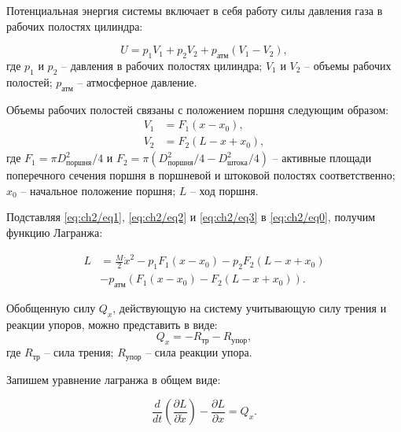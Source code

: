 Потенциальная энергия системы включает в себя работу силы давления газа в рабочих полостях цилиндра:

\begin{equation}
\label{eq:ch2/eq2}
    U = p_1 V_1 + p_2 V_2 + p_\text{атм} (V_1 - V_2),
\end{equation}
где $p_1$ и $p_2$ -- давления в рабочих полостях цилиндра;
$V_1$ и $V_2$ -- объемы рабочих полостей;
$p_\text{атм}$ -- атмосферное давление.

Объемы рабочих полостей связаны с положением поршня следующим образом:
\begin{equation}
\label{eq:ch2/eq3}
    \begin{aligned}
        V_1 & = F_1 (x - x_0),     \\
        V_2 & = F_2 (L - x + x_0),
    \end{aligned}
\end{equation}
где $F_1=\pi D_{поршня}^2/4 $ и $F_2 = \pi (D_{поршня}^2/4 - D_{штока}^2/4)$ -- активные площади поперечного сечения поршня в поршневой и штоковой полостях соответственно;
$x_0$ -- начальное положение поршня;
$L$ -- ход поршня.

Подставляя \eqref{eq:ch2/eq1}, \eqref{eq:ch2/eq2} и \eqref{eq:ch2/eq3} в \eqref{eq:ch2/eq0}, получим функцию Лагранжа:

\begin{equation}
\label{eq:ch2/eq4}
    \begin{aligned}
        L & = \frac{M}{2} \dot{x}^2 - p_1 F_1 (x - x_0) - p_2 F_2 (L - x + x_0) \\
          & - p_\text{атм} (F_1 (x - x_0) - F_2 (L - x + x_0)).
    \end{aligned}
\end{equation}

Обобщенную силу $Q_x$, действующую на систему учитывающую силу трения и реакции упоров, можно представить в виде:
\begin{equation}
\label{eq:ch2/eq5}
    Q_x = - R_{\text{тр}} - R_{\text{упор}},
\end{equation}
где $R_{\text{тр}}$ -- сила трения; $R_{\text{упор}}$ -- сила реакции упора.

Запишем уравнение лагранжа в общем виде:

\begin{equation}
\label{eq:ch2/eq6}
    \frac{d}{dt} \left( \frac{\partial L}{\partial \dot{x}} \right) - \frac{\partial L}{\partial x} = Q_x.
\end{equation}

